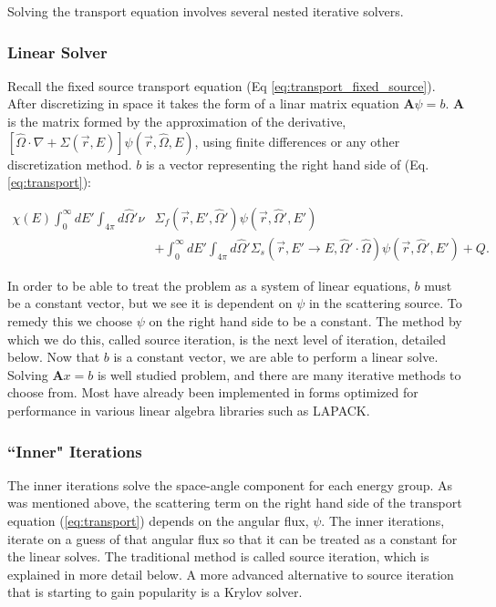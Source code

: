 
Solving the transport equation involves several nested iterative solvers. 
\subsubsection{Linear Solver}
Recall the fixed source transport equation (Eq \ref{eq:transport_fixed_source}). After discretizing in space it takes the form of a linar matrix equation $\textbf{A}\psi = b$. $\textbf{A}$ is the matrix formed by the approximation of the derivative, $[\hat{\Omega} \cdot \nabla + \Sigma(\vec{r}, E)]\psi(\vec{r}, \hat{\Omega}, E)$, using finite differences or any other discretization method. $b$ is a vector representing the right hand side of (Eq. \ref{eq:transport}): 

\begin{align}
\chi(E) \int_0^\infty dE'  \int_{4\pi} d\hat{\Omega}' \nu &\Sigma_{f}(\vec{r}, E', \hat{\Omega}')\psi(\vec{r}, \hat{\Omega}', E') \nonumber \\ &+ \int_0^\infty dE' \int_{4\pi} d\hat{\Omega}' \Sigma_s(\vec{r}, E' \rightarrow E, \hat{\Omega}' \cdot \hat{\Omega})\psi(\vec{r}, \hat{\Omega}', E')  + Q. \nonumber
\end{align}

In order to be able to treat the problem as a system of linear equations, $b$ must be a constant vector, but we see it is dependent on $\psi$ in the scattering source. To remedy this we choose $\psi$ on the right hand side to be a constant. The method by which we do this, called source iteration, is the next level of iteration, detailed below. Now that $b$ is a constant vector, we are able to perform a linear solve. Solving $\textbf{A}x = b$ is well studied problem, and there are many iterative methods to choose from. Most have already been implemented in forms optimized for performance in various linear algebra libraries such as LAPACK.

\subsubsection{``Inner" Iterations}
The inner iterations solve the space-angle component for each energy group. As was mentioned above, the scattering term on the right hand side of the transport equation (\ref{eq:transport}) depends on the angular flux, $\psi$. The inner iterations, iterate on a guess of that angular flux so that it can be treated as a constant for the linear solves. The traditional method is called source iteration, which is explained in more detail below. A more advanced alternative to source iteration that is starting to gain popularity is a Krylov solver. 


